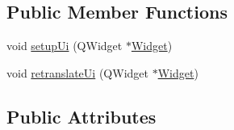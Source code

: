 \subsection*{Public Member Functions}
\begin{DoxyCompactItemize}
\item 
void \hyperlink{classUi__Widget_a9039ed8704971418cbe19ef8c9eea266}{setup\+Ui} (Q\+Widget $\ast$\hyperlink{classWidget}{Widget})
\item 
void \hyperlink{classUi__Widget_ae1cb85db8d3658df8dcd104361edcecb}{retranslate\+Ui} (Q\+Widget $\ast$\hyperlink{classWidget}{Widget})
\end{DoxyCompactItemize}
\subsection*{Public Attributes}

